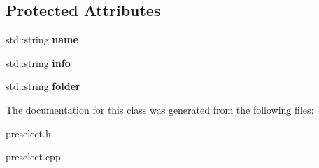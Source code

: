 \subsection*{Protected Attributes}
\begin{DoxyCompactItemize}
\item 
std\+::string {\bfseries name}\hypertarget{classCocoOptimiser_a6832a1c556a6af0f47b0e1de31fc7488}{}\label{classCocoOptimiser_a6832a1c556a6af0f47b0e1de31fc7488}

\item 
std\+::string {\bfseries info}\hypertarget{classCocoOptimiser_a01d71a1cc52374efb3d9e0b4c80e44e7}{}\label{classCocoOptimiser_a01d71a1cc52374efb3d9e0b4c80e44e7}

\item 
std\+::string {\bfseries folder}\hypertarget{classCocoOptimiser_a92f48d32c1606ebee1f3d4d432553f4c}{}\label{classCocoOptimiser_a92f48d32c1606ebee1f3d4d432553f4c}

\end{DoxyCompactItemize}


The documentation for this class was generated from the following files\+:\begin{DoxyCompactItemize}
\item 
preselect.\+h\item 
preselect.\+cpp\end{DoxyCompactItemize}
